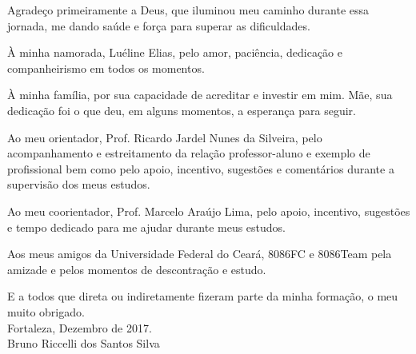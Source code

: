 \begin{agradecimentos}[AGRADECIMENTOS]
Agradeço primeiramente a Deus, que iluminou meu caminho durante essa jornada, me dando saúde e força para superar as dificuldades.

À minha namorada, Luéline Elias, pelo amor, paciência, dedicação e companheirismo em todos os momentos.

À minha família, por sua capacidade de acreditar e investir em mim. Mãe, sua dedicação foi o que deu, em alguns momentos, a esperança para seguir. 

Ao meu orientador, Prof. Ricardo Jardel Nunes da Silveira, pelo acompanhamento e estreitamento da relação professor-aluno e exemplo de profissional bem como pelo apoio, incentivo, sugestões e comentários durante a supervisão dos meus estudos.

Ao meu coorientador, Prof. Marcelo Araújo Lima, pelo apoio, incentivo, sugestões e tempo dedicado para me ajudar durante meus estudos.

Aos meus amigos da Universidade Federal do Ceará, 8086FC e 8086Team pela amizade e pelos momentos de descontração e estudo.

E a todos que direta ou indiretamente fizeram parte da minha formação, o meu muito obrigado.\\

Fortaleza, Dezembro de 2017.\\

Bruno Riccelli dos Santos Silva\\
\end{agradecimentos}
